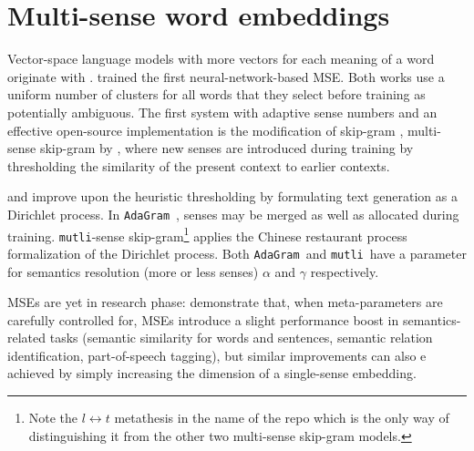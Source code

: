 \documentclass[11pt]{article}
\newcommand{\adagram}{\texttt{AdaGram}}
\newcommand{\mutli}{\texttt{mutli}}
\begin{document}
\section{Multi-sense word embeddings}

Vector-space language models with more vectors for each meaning of a
word originate with \cite{Reisinger:2010}.
\cite{Huang:2012} trained the first neural-network-based MSE.
Both works use a uniform number of clusters for all words that they select
before training as potentially ambiguous.
The first system with adaptive sense numbers and an effective open-source
implementation is the 
modification of skip-gram \cite{Mikolov:2013d}, multi-sense skip-gram by
\cite{Neelakantan:2014}, where new senses are introduced during training by
thresholding the similarity of the present context to earlier contexts.



\cite{Bartunov:2015} and \cite{Li:2015} improve upon the heuristic thresholding
by formulating text generation as a Dirichlet process. In
\adagram~\citep{Bartunov:2015}, senses may be merged as well as allocated
during training. \mutli-sense skip-gram\footnote{Note the $l\leftrightarrow
t$ metathesis in the name of the repo which is the only way of distinguishing it
from the other two multi-sense skip-gram models.} \citep{Li:2015} applies the
Chinese restaurant process formalization of the Dirichlet process. Both
\adagram~and \mutli~have a parameter for semantics resolution (more or less
senses) $\alpha$ and $\gamma$ respectively. 


MSEs are yet in
research phase: \cite{Li:2015}  demonstrate that, when meta-parameters are
carefully controlled for, MSEs introduce a slight performance boost in
semantics-related tasks (semantic similarity for words and sentences, semantic
relation identification, part-of-speech tagging), but similar improvements can
also e achieved by simply increasing the dimension of a single-sense embedding.
\end{document}
